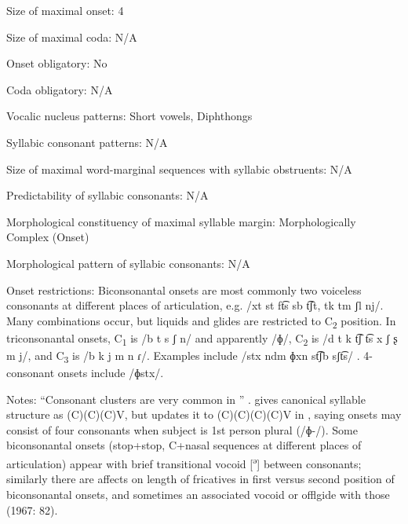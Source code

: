 {\begin{appendixdesc}
\item[Size of maximal onset:] 4

\item[Size of maximal coda:] N/A

\item[Onset obligatory:] No

\item[Coda obligatory:] N/A

\item[Vocalic nucleus patterns:] Short vowels, Diphthongs

\item[Syllabic consonant patterns:] N/A

\item[Size of maximal word-marginal sequences with syllabic obstruents:] N/A

\item[Predictability of syllabic consonants:] N/A

\item[Morphological constituency of maximal syllable margin:] Morphologically Complex (Onset)

\item[Morphological pattern of syllabic consonants:] N/A

\item[Onset restrictions:] Biconsonantal onsets are most commonly two voiceless consonants at different places of articulation, e.g. /xt st ft͡s sb t͡ʃt, tk tm ʃl nj/. Many combinations occur, but liquids and glides are restricted to C\textsubscript{2} position. In triconsonantal onsets, C\textsubscript{1} is /b t s ʃ n/ and apparently /ɸ/, C\textsubscript{2} is /d t k t͡ʃ t͡s x ʃ ʂ m j/, and C\textsubscript{3} is /b k j m n ɾ/. Examples include /stx ndm ɸxn st͡ʃb sʃt͡s/ . 4-consonant onsets include /ɸstx/.

\item[Notes:] “Consonant clusters are very common in ” \citep[81]{Howard1967}. \citet{Howard1967} gives canonical syllable structure as (C)(C)(C)V, but updates it to (C)(C)(C)(C)V in \citet{Howard1972}, saying onsets may consist of four consonants when subject is 1st person plural (/ɸ{}-/). Some biconsonantal onsets (stop+stop, C+nasal sequences at different places of articulation) appear with brief transitional vocoid [\textsuperscript{ə}] between consonants; similarly there are affects on length of fricatives in first versus second position of biconsonantal onsets, and sometimes an associated vocoid or offlgide with those (1967: 82).
\end{appendixdesc}
}
